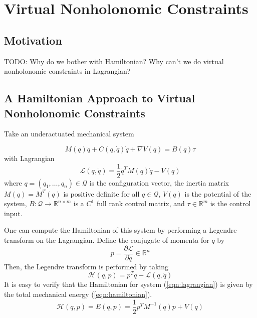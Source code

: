 
\section{Virtual Nonholonomic Constraints}

\subsection{Motivation}
TODO: Why do we bother with Hamiltonian? Why can't we do virtual nonholonomic constraints in Lagrangian?

\subsection{A Hamiltonian Approach to Virtual Nonholonomic Constraints}
Take an underactuated mechanical system 

\begin{equation}\label{eqn:eom_lagrangian}
M(q)\ddot{q} + C(q,\dot{q})\dot{q} + \nabla V(q) = B(q)\tau
\end{equation}
with Lagrangian
\begin{equation}\label{eqn:lagrangian}
\mathcal{L}(q,\dot{q}) = \frac{1}{2} \dot{q}^T M(q) \dot{q} - V(q)
\end{equation}
where \(q = (q_1,\ldots,q_n) \in \mathcal{Q}\) is the configuration vector, the inertia matrix \(M(q) = M^T(q)\) is positive definite for all \(q \in \mathcal{Q}\), \(V(q)\) is the potential of the system, \(B : \mathcal{Q} \rightarrow \mathbb{R}^{n \times m}\) is a \(C^1\) full rank control matrix, and \(\tau \in \mathbb{R}^{m}\) is the control input.

One can compute the Hamiltonian of this system by performing a Legendre transform on the Lagrangian. Define the conjugate of momenta for \(q\) by 
\[
p = \frac{\partial \mathcal{L}}{\partial \dot{q}} \in \mathbb{R}^n
\]
Then, the Legendre transform is performed by taking
\[
\mathcal{H}(q,p) = p^T \dot{q} - \mathcal{L}(q,\dot{q})
\]
It is easy to verify that the Hamiltonian for system (\ref{eqn:lagrangian}) is given by the total mechanical energy (\ref{eqn:hamiltonian}).
\begin{equation}\label{eqn:hamiltonian}
\mathcal{H}(q,p) = E(q,p) = \frac{1}{2} p^T M^{-1}(q) p + V(q)
\end{equation}


